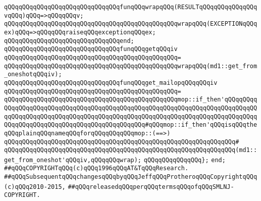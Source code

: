 \newline
\newline
\verb|qQQqqQQqqQQqqQQqqQQqqQQqqQQqqQQqfunqQQqwrapqQQq(RESULTqQQqqQQqqQQqqQQqvqQQq)qQQq=>qQQqqQQqv;|\newline
\verb|qQQqqQQqqQQqqQQqqQQqqQQqqQQqqQQqqQQqqQQqqQQqqQQqwrapqQQq(EXCEPTIONqQQqex)qQQq=>qQQqqQQqraiseqQQqexceptionqQQqex;|\newline
\verb|qQQqqQQqqQQqqQQqqQQqqQQqqQQqqQQqend;|\newline
\newline
\newline
\verb|qQQqqQQqqQQqqQQqqQQqqQQqqQQqqQQqfunqQQqgetqQQqiv|\newline
\verb|qQQqqQQqqQQqqQQqqQQqqQQqqQQqqQQqqQQqqQQqqQQqqQQq=|\newline
\verb|qQQqqQQqqQQqqQQqqQQqqQQqqQQqqQQqqQQqqQQqqQQqqQQqwrapqQQq(md1::get_from_oneshotqQQqiv);|\newline
\newline
\newline
\verb|qQQqqQQqqQQqqQQqqQQqqQQqqQQqqQQqfunqQQqget_mailopqQQqqQQqiv|\newline
\verb|qQQqqQQqqQQqqQQqqQQqqQQqqQQqqQQqqQQqqQQqqQQqqQQq=|\newline
\verb|qQQqqQQqqQQqqQQqqQQqqQQqqQQqqQQqqQQqqQQqqQQqqQQqmop::if_then'qQQqqQQqqQQqqQQqqQQqqQQqqQQqqQQqqQQqqQQqqQQqqQQqqQQqqQQqqQQqqQQqqQQqqQQqqQQqqQQqqQQqqQQqqQQqqQQqqQQqqQQqqQQqqQQqqQQqqQQqqQQqqQQqqQQqqQQqqQQqqQQqqQQqqQQqqQQqqQQqqQQqqQQqqQQqqQQqqQQqqQQqqQQq#qQQqmop::if_then'qQQqisqQQqtheqQQqplainqQQqnameqQQqforqQQqqQQqqQQqmop::(==>)|\newline
\verb|qQQqqQQqqQQqqQQqqQQqqQQqqQQqqQQqqQQqqQQqqQQqqQQqqQQqqQQqqQQqqQQq#|\newline
\verb|qQQqqQQqqQQqqQQqqQQqqQQqqQQqqQQqqQQqqQQqqQQqqQQqqQQqqQQqqQQqqQQq(md1::get_from_oneshot'qQQqiv,qQQqqQQqwrap);|\newline
\newline
\verb|qQQqqQQqqQQqqQQq};|\newline
\verb|end;|\newline
\newline
\newline
\verb|##qQQqCOPYRIGHTqQQq(c)qQQq1996qQQqAT&TqQQqResearch.|\newline
\verb|##qQQqSubsequentqQQqchangesqQQqbyqQQqJeffqQQqProtheroqQQqCopyrightqQQq(c)qQQq2010-2015,|\newline
\verb|##qQQqreleasedqQQqperqQQqtermsqQQqofqQQqSMLNJ-COPYRIGHT.|\newline

